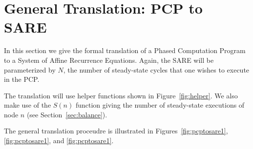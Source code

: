 
\section{General Translation: PCP to SARE}
\label{sec:translate}

In this section we give the formal translation of a Phased Computation
Program to a System of Affine Recurrence Equations.  Again, the SARE
will be parameterized by $N$, the number of steady-state cycles that
one wishes to execute in the PCP.  

The translation will use helper functions shown in
Figure~\ref{fig:helper}.  We also make use of the $S(n)$ function
giving the number of steady-state executions of node $n$ (see
Section~\ref{sec:balance}).



The general translation proceudre is illustrated in
Figures~\ref{fig:pcptosare1},\ref{fig:pcptosare1}, and
\ref{fig:pcptosare1}.

